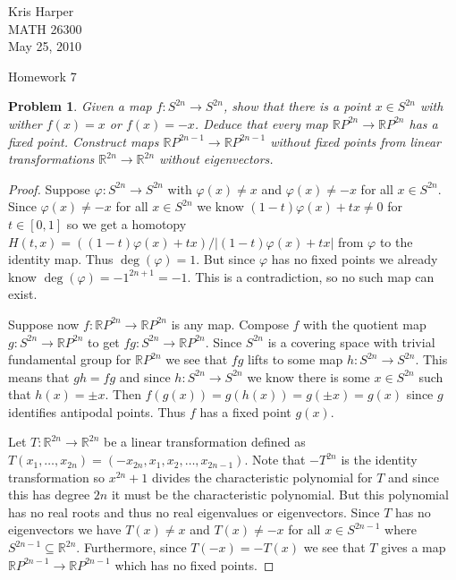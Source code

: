 \documentclass{article}
\newtheorem{problem}{Problem}
\begin{document}
\begin{flushright}
Kris Harper\\

MATH 26300\\

May 25, 2010
\end{flushright}

\begin{center}
Homework 7
\end{center}

\begin{problem}
Given a map $f : S^{2n} \to S^{2n}$, show that there is a point $x \in S^{2n}$ with wither $f(x) = x$ or $f(x) = -x$. Deduce that every map $\mathbb{R}P^{2n} \to \mathbb{R}P^{2n}$ has a fixed point. Construct maps $\mathbb{R}P^{2n-1} \to \mathbb{R}P^{2n-1}$ without fixed points from linear transformations $\mathbb{R}^{2n} \to \mathbb{R}^{2n}$ without eigenvectors.
\end{problem}
\begin{proof}
Suppose $\varphi : S^{2n} \to S^{2n}$ with $\varphi(x) \neq x$ and $\varphi(x) \neq -x$ for all $x \in S^{2n}$. Since $\varphi(x) \neq -x$ for all $x \in S^{2n}$ we know $(1-t)\varphi(x) + tx \neq 0$ for $t \in [0,1]$ so we get a homotopy $H(t,x) = ((1-t)\varphi(x) + tx)/|(1-t)\varphi(x) + tx|$ from $\varphi$ to the identity map. Thus $\deg(\varphi) = 1$. But since $\varphi$ has no fixed points we already know $\deg(\varphi) = -1^{2n+1} = -1$. This is a contradiction, so no such map can exist.

Suppose now $f : \mathbb{R}P^{2n} \to \mathbb{R}P^{2n}$ is any map. Compose $f$ with the quotient map $g : S^{2n} \to \mathbb{R}P^{2n}$ to get $fg : S^{2n} \to \mathbb{R}P^{2n}$. Since $S^{2n}$ is a covering space with trivial fundamental group for $\mathbb{R}P^{2n}$ we see that $fg$ lifts to some map $h : S^{2n} \to S^{2n}$. This means that $gh = fg$ and since $h : S^{2n} \to S^{2n}$ we know there is some $x \in S^{2n}$ such that $h(x) = \pm x$. Then $f(g(x)) = g(h(x)) = g(\pm x) = g(x)$ since $g$ identifies antipodal points. Thus $f$ has a fixed point $g(x)$.

Let $T : \mathbb{R}^{2n} \to \mathbb{R}^{2n}$ be a linear transformation defined as $T(x_1, \dots , x_{2n}) = (-x_{2n}, x_1, x_2, \dots , x_{2n-1})$. Note that $-T^{2n}$ is the identity transformation so $x^{2n} + 1$ divides the characteristic polynomial for $T$ and since this has degree $2n$ it must be the characteristic polynomial. But this polynomial has no real roots and thus no real eigenvalues or eigenvectors. Since $T$ has no eigenvectors we have $T(x) \neq x$ and $T(x) \neq -x$ for all $x \in S^{2n-1}$ where $S^{2n-1} \subseteq \mathbb{R}^{2n}$. Furthermore, since $T(-x) = -T(x)$ we see that $T$ gives a map $\mathbb{R}P^{2n-1} \to \mathbb{R}P^{2n-1}$ which has no fixed points.
\end{proof}
\end{document}

